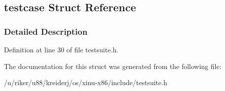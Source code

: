\hypertarget{structtestcase}{}\subsection{testcase Struct Reference}
\label{structtestcase}


\subsubsection{Detailed Description}


Definition at line 30 of file testsuite.\+h.



The documentation for this struct was generated from the following file\+:\begin{DoxyCompactItemize}
\item 
/u/riker/u88/kreiderj/os/xinu-\/x86/include/testsuite.\+h\end{DoxyCompactItemize}
